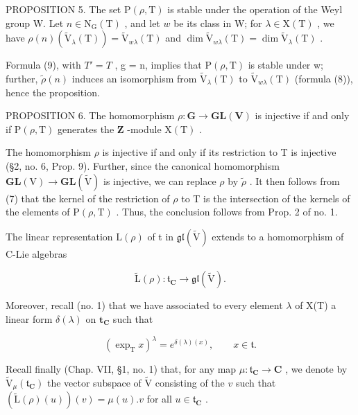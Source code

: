 PROPOSITION 5. The set \(\mathrm{P}(\rho, \mathrm{T})\) is stable under the operation of the Weyl group W. Let \(n \in \mathrm{N}_{\mathrm{G}}(\mathrm{T})\) , and let \(w\) be its class in W; for \(\lambda \in \mathrm{X}(\mathrm{T})\) , we have \(\rho(n)(\tilde{\mathrm{V}}_{\lambda}(\mathrm{T})) = \tilde{\mathrm{V}}_{w\lambda}(\mathrm{T})\) and \(\dim \tilde{\mathrm{V}}_{w\lambda}(\mathrm{T}) = \dim \tilde{\mathrm{V}}_{\lambda}(\mathrm{T})\) .

Formula (9), with \(T' = T\) , g = n, implies that \(\mathrm{P}(\rho, \mathrm{T})\) is stable under w; further, \(\tilde{\rho}(n)\) induces an isomorphism from \(\tilde{\mathrm{V}}_{\lambda}(\mathrm{T})\) to \(\tilde{\mathrm{V}}_{w\lambda}(\mathrm{T})\) (formula (8)), hence the proposition.

PROPOSITION 6. The homomorphism \(\rho : \mathbf{G} \to \mathbf{GL}(\mathbf{V})\) is injective if and only if \(\mathrm{P}(\rho, \mathrm{T})\) generates the \(\mathbf{Z}\) -module \(\mathrm{X}(\mathrm{T})\) .

The homomorphism \(\rho\) is injective if and only if its restriction to T is injective (§2, no. 6, Prop. 9). Further, since the canonical homomorphism \(\mathbf{GL}(\mathrm{V}) \to \mathbf{GL}(\tilde{\mathrm{V}})\) is injective, we can replace \(\rho\) by \(\tilde{\rho}\) . It then follows from (7) that the kernel of the restriction of \(\rho\) to T is the intersection of the kernels of the elements of \(\mathrm{P}(\rho, \mathrm{T})\) . Thus, the conclusion follows from Prop. 2 of no. 1.

The linear representation \(\mathrm{L}(\rho)\) of t in \(\mathfrak{gl}(\tilde{\mathrm{V}})\) extends to a homomorphism of C-Lie algebras

\[
\tilde {\mathrm{L}} (\rho): \mathfrak {t} _ {\mathbf {C}} \to \mathfrak {g l} (\tilde {\mathrm{V}}).
\]

Moreover, recall (no. 1) that we have associated to every element \(\lambda\) of X(T) a linear form \(\delta (\lambda)\) on \(\mathbf{t}_{\mathbf{C}}\) such that

\[
(\exp_ {\mathrm{T}} x) ^ {\lambda} = e ^ {\delta (\lambda) (x)}, \qquad x \in \mathfrak {t}.\tag{10}
\]

Recall finally (Chap. VII, §1, no. 1) that, for any map \(\mu : \mathfrak{t}_{\mathbf{C}} \to \mathbf{C}\) , we denote by \(\tilde{\mathrm{V}}_{\mu}(\mathfrak{t}_{\mathbf{C}})\) the vector subspace of \(\tilde{\mathrm{V}}\) consisting of the \(v\) such that \((\tilde{\mathrm{L}}(\rho)(u))(v) = \mu(u).v\) for all \(u \in \mathfrak{t}_{\mathbf{C}}\) .

